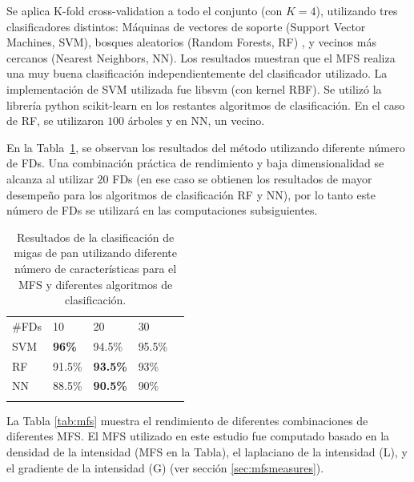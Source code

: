 Se aplica K-fold cross-validation a todo el conjunto (con $K=4$), utilizando tres clasificadores distintos: Máquinas de vectores de soporte (Support Vector Machines, \acrshort{SVM}),  bosques aleatorios (Random Forests, \acrshort{RF}) \cite{Breiman2001}, y vecinos más cercanos (Nearest Neighbors, \acrshort{NN}).
Los resultados muestran que el MFS realiza una muy buena clasificación independientemente del clasificador utilizado.
La implementación de SVM utilizada fue \textsf{libsvm} \cite{Chang2011} (con kernel RBF).
Se utilizó la librería python \textsf{scikit-learn} en los restantes algoritmos de clasificación.
En el caso de RF, se utilizaron $100$ árboles y en NN, un vecino.

En la Tabla~\ref{tab:number}, se observan los resultados del método utilizando diferente número de FDs.
Una combinación práctica de rendimiento y baja dimensionalidad se alcanza al utilizar $20$ FDs (en ese caso se obtienen los resultados de mayor desempeño para los algoritmos de clasificación RF y NN), por lo tanto este número de FDs se utilizará en las computaciones subsiguientes.





\begin{table}[h!]
\center
\begin{tabular}{lllll}
\hline\noalign{\smallskip}
\#FDs & 10  & 20 & 30 \\
\noalign{\smallskip}\hline\noalign{\smallskip}
SVM & \textbf{96\%} & 94.5\% & 95.5\% \\
RF  & 91.5\% & \textbf{93.5\%} & 93\% \\
NN & 88.5\% & \textbf{90.5\%} & 90\% \\
\noalign{\smallskip}\hline
\end{tabular}
\caption{Resultados de la clasificación de migas de pan utilizando diferente número de características para el MFS y diferentes algoritmos de clasificación.}
\label{tab:number}       %
\end{table}


La Tabla \ref{tab:mfs} muestra el rendimiento de diferentes combinaciones de diferentes MFS.
El MFS utilizado en este estudio fue computado basado en la densidad de la intensidad (MFS en la Tabla), el laplaciano de la intensidad (L), y el gradiente de la intensidad (G) (ver sección \ref{sec:mfsmeasures}).


